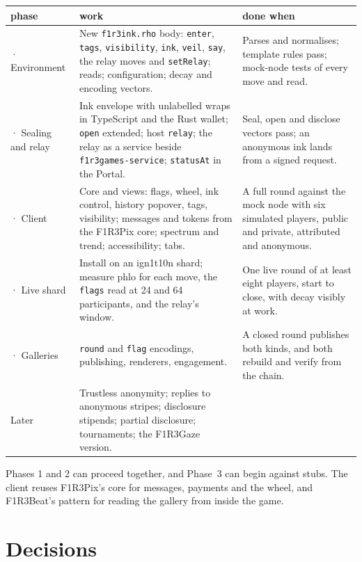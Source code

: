 \documentclass[11pt,a4paper]{article}
\newcommand{\code}[1]{\texttt{#1}}
\newcounter{req}
\begin{document}
\begin{center}\small
\begin{tabularx}{\linewidth}{@{}>{\raggedright\arraybackslash}p{28mm} X >{\raggedright\arraybackslash}p{44mm}@{}}
\toprule
phase & work & done when\\
\midrule
1 · Environment & New \code{f1r3ink.rho} body: \code{enter}, \code{tags}, \code{visibility}, \code{ink}, \code{veil}, \code{say}, the relay moves and \code{setRelay}; reads; configuration; decay and encoding vectors. & Parses and normalises; template rules pass; mock-node tests of every move and read.\\
2 · Sealing and relay & Ink envelope with unlabelled wraps in TypeScript and the Rust wallet; \code{open} extended; host \code{relay}; the relay as a service beside \code{f1r3games-service}; \code{statusAt} in the Portal. & Seal, open and disclose vectors pass; an anonymous ink lands from a signed request.\\
3 · Client & Core and views: flags, wheel, ink control, history popover, tags, visibility; messages and tokens from the F1R3Pix core; spectrum and trend; accessibility; tabs. & A full round against the mock node with six simulated players, public and private, attributed and anonymous.\\
4 · Live shard & Install on an ign1t10n shard; measure phlo for each move, the \code{flags} read at 24 and 64 participants, and the relay's window. & One live round of at least eight players, start to close, with decay visibly at work.\\
5 · Galleries & \code{round} and \code{flag} encodings, publishing, renderers, engagement. & A closed round publishes both kinds, and both rebuild and verify from the chain.\\
Later & Trustless anonymity; replies to anonymous stripes; disclosure stipends; partial disclosure; tournaments; the F1R3Gaze version. & \\
\bottomrule
\end{tabularx}
\end{center}

Phases 1 and 2 can proceed together, and Phase~3 can begin against stubs. The client reuses
F1R3Pix's core for messages, payments and the wheel, and F1R3Beat's pattern for reading the
gallery from inside the game.

\section{Decisions}\label{sec:decisions}
\end{document}
